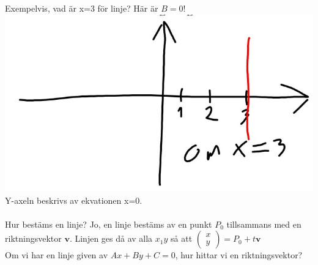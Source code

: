 Exempelvis, vad är x=3 för linje? Här är $B=0$!\\
\includegraphics[scale=0.35]{imgs/22-01-24img02.jpg}\\
Y-axeln beskrivs av ekvationen x=0.\\
\\
Hur bestäms en linje? Jo, en linje bestäms av en punkt $P_{0}$ tillsammans med en riktningsvektor $\bm{v}$.
Linjen ges då av alla $x_{1}y$ så att $\begin{pmatrix}x\\y\end{pmatrix}=P_{0}+t\bm{v}$\\
Om vi har en linje given av $Ax+By+C=0$, hur hittar vi en riktningsvektor?


